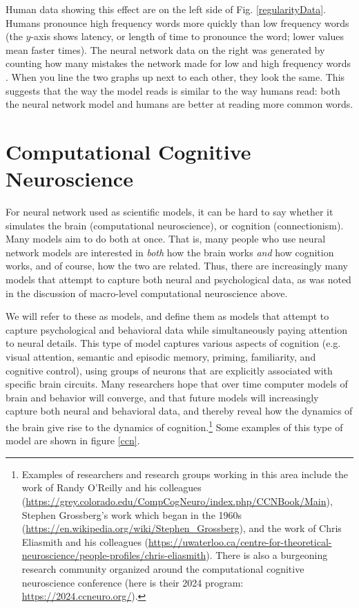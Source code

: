 Human data showing this effect are on the left side of Fig. \ref{regularityData}. Humans pronounce high frequency words more quickly than  low frequency words (the $y$-axis shows latency, or length of time to pronounce the word; lower values mean faster times). The neural network data on the right  was generated by counting how many mistakes the network made for low and high frequency words \cite{seidenberg1989distributed}. When you line the two graphs up next to each other, they look the same. This suggests that the way the model reads is similar to the way humans read: both the neural network model and humans are better at reading more common words.

\section{Computational Cognitive Neuroscience}\label{mixedCases}

 For neural network used as scientific models, it can be hard to say whether it simulates the brain (computational neuroscience), or cognition (connectionism). Many models aim to do both at once.
That is, many people who use neural network models are interested in \emph{both} how the brain works \emph{and} how cognition works, and of course, how the two are related. Thus, there are increasingly many models that attempt to capture both neural and psychological data, as was noted in the discussion of macro-level computational neuroscience above. 

We will refer to these as  models, and define them as models that attempt to capture psychological and behavioral data while simultaneously paying attention to neural details. This type of model captures various aspects of cognition (e.g. visual attention, semantic and episodic memory, priming, familiarity, and cognitive control), using groups of neurons that are explicitly associated with specific brain circuits. Many researchers hope that over time computer models of brain and behavior will converge, and that future models will increasingly capture both neural and behavioral data, and thereby reveal how the dynamics of the brain give rise to the dynamics of cognition.\footnote{Examples of researchers and research groups working in this area include the work of Randy O'Reilly and his colleagues (\url{https://grey.colorado.edu/CompCogNeuro/index.php/CCNBook/Main}), Stephen Grossberg's work which began in the 1960s (\url{https://en.wikipedia.org/wiki/Stephen_Grossberg}), and the work of Chris Eliasmith and his colleagues (\url{https://uwaterloo.ca/centre-for-theoretical-neuroscience/people-profiles/chris-eliasmith}). There is also a burgeoning research community organized around the computational cognitive neuroscience conference (here is their 2024 program: \url{https://2024.ccneuro.org/}).} Some examples of this type of model are shown in figure \ref{ccn}.

